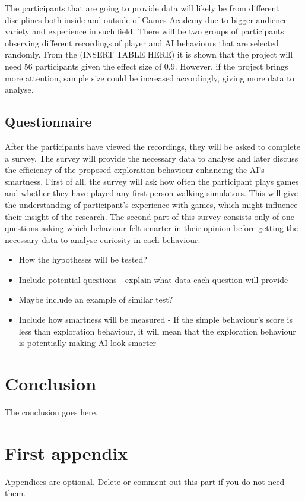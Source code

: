 \documentclass[journal]{IEEEtran}
\begin{document}
The participants that are going to provide data will likely be from different disciplines both inside and outside of Games Academy due to bigger audience variety and experience in such field. There will be two groups of participants observing different recordings of player and AI behaviours that are selected randomly. From the (INSERT TABLE HERE) it is shown that the project will need 56 participants given the effect size of 0.9. However, if the project brings more attention, sample size could be increased accordingly, giving more data to analyse.

\subsection{Questionnaire}
After the participants have viewed the recordings, they will be asked to complete a survey. The survey will provide the necessary data to analyse and later discuss the efficiency of the proposed exploration behaviour enhancing the AI's smartness. First of all, the survey will ask how often the participant plays games and whether they have played any first-person walking simulators. This will give the understanding of participant's experience with games, which might influence their insight of the research. The second part of this survey consists only of one questions asking which behaviour felt smarter in their opinion before getting the necessary data to analyse curiosity in each behaviour.

\begin{itemize}
	\item How the hypotheses will be tested?
	\item Include potential questions - explain what data each question will provide
	\item Maybe include an example of similar test?
	\item Include how smartness will be measured - If the simple behaviour's score is less than exploration behaviour, it will mean that the exploration behaviour is potentially making AI look smarter
\end{itemize}

\section{Conclusion}
The conclusion goes here.






\appendices
\section{First appendix}
Appendices are optional. Delete or comment out this part if you do not need them.


\end{document}
